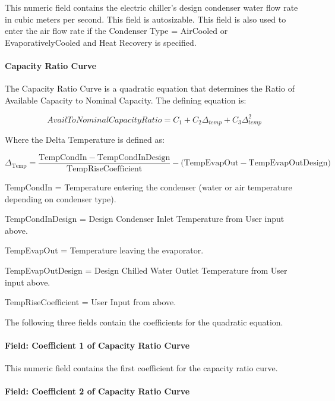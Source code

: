 This numeric field contains the electric chiller's design condenser water flow rate in cubic meters per second. This field is autosizable. This field is also used to enter the air flow rate if the Condenser Type = AirCooled or EvaporativelyCooled and Heat Recovery is specified.

\paragraph{Capacity Ratio Curve}\label{capacity-ratio-curve}

The Capacity Ratio Curve is a quadratic equation that determines the Ratio of Available Capacity to Nominal Capacity. The defining equation is:

\begin{equation}
    AvailToNominalCapacityRatio = {C_1} + {C_2}{\Delta_{temp}} + {C_3}\Delta_{temp}^2
\end{equation}

Where the Delta Temperature is defined as:

\begin{equation}
{\Delta_{{\mathrm{Temp}}}}
    = \frac{{{\mathrm{TempCondIn  -  TempCondInDesign }}}}{{{\mathrm{TempRiseCoefficient}}}} - ({\mathrm{TempEvapOut  -  TempEvapOutDesign)}}
\end{equation}

TempCondIn = Temperature entering the condenser (water or air temperature depending on condenser type).

TempCondInDesign = Design Condenser Inlet Temperature from User input above.

TempEvapOut = Temperature leaving the evaporator.

TempEvapOutDesign = Design Chilled Water Outlet Temperature from User input above.

TempRiseCoefficient = User Input from above.

The following three fields contain the coefficients for the quadratic equation.

\paragraph{Field: Coefficient 1 of Capacity Ratio Curve}\label{field-coefficient-1-of-capacity-ratio-curve}

This numeric field contains the first coefficient for the capacity ratio curve.

\paragraph{Field: Coefficient 2 of Capacity Ratio Curve}\label{field-coefficient-2-of-capacity-ratio-curve}

